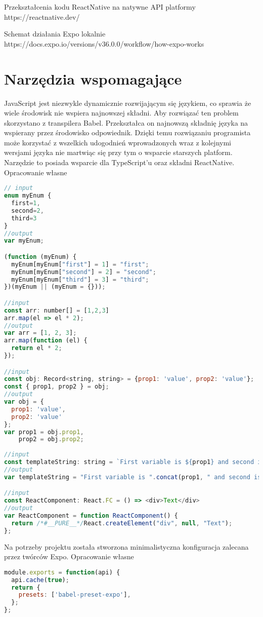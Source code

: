\documentclass[skorowidz,skroty]{dyplomWEZUT}
\begin{document}
{Przekształcenia kodu ReactNative na natywne API platformy \label{fig:react-native}}
{https://reactnative.dev/}

{Schemat działania Expo lokalnie \label{fig:expo}}
{https://docs.expo.io/versions/v36.0.0/workflow/how-expo-works}

\section{Narzędzia wspomagające}\label{sec: tools}

JavaScript jest niezwykle dynamicznie rozwijającym się językiem, co sprawia że wiele środowisk nie wspiera najnowszej składni. Aby rozwiązać ten problem skorzystano z transpilera Babel. Przekształca on najnowszą składnię języka na wspierany przez środowisko odpowiednik. Dzięki temu rozwiązaniu programista może korzystać z wszelkich udogodnień wprowadzonych wraz z kolejnymi wersjami języka nie martwiąc się przy tym o wsparcie starszych platform. Narzędzie to posiada wsparcie dla TypeScript'u oraz składni ReactNative.  
{Opracowanie własne}{\label{code: babel}}
\begin{lstlisting}[language=JavaScript]
// input
enum myEnum {
  first=1,
  second=2,
  third=3
}
//output 
var myEnum;

(function (myEnum) {
  myEnum[myEnum["first"] = 1] = "first";
  myEnum[myEnum["second"] = 2] = "second";
  myEnum[myEnum["third"] = 3] = "third";
})(myEnum || (myEnum = {}));

//input 
const arr: number[] = [1,2,3]
arr.map(el => el * 2);
//output 
var arr = [1, 2, 3];
arr.map(function (el) {
  return el * 2;
});

//input 
const obj: Record<string, string> = {prop1: 'value', prop2: 'value'};
const { prop1, prop2 } = obj;
//output 
var obj = {
  prop1: 'value',
  prop2: 'value'
};
var prop1 = obj.prop1,
    prop2 = obj.prop2;    
    
//input
const templateString: string = `First variable is ${prop1} and second is ${prop2}`;
//output
var templateString = "First variable is ".concat(prop1, " and second is ").concat(prop2);

//input
const ReactComponent: React.FC = () => <div>Text</div>
//output
var ReactComponent = function ReactComponent() {
  return /*#__PURE__*/React.createElement("div", null, "Text");
};

\end{lstlisting}
Na potrzeby projektu została stworzona minimalistyczna konfiguracja zalecana przez twórców Expo. 
{Opracowanie własne}{\label{code: babel config}}
\begin{lstlisting}[language=JavaScript]
module.exports = function(api) {
  api.cache(true);
  return {
    presets: ['babel-preset-expo'],
  };
};
\end{lstlisting}
\end{document}
